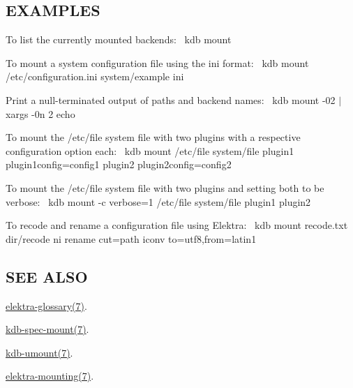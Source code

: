 \subsection*{E\+X\+A\+M\+P\+L\+ES}

To list the currently mounted backends\+:~\newline
 {\ttfamily kdb mount}

To mount a system configuration file using the ini format\+:~\newline
 {\ttfamily kdb mount /etc/configuration.ini system/example ini}

Print a null-\/terminated output of paths and backend names\+:~\newline
 {\ttfamily kdb mount -\/02 $\vert$ xargs -\/0n 2 echo}

To mount the /etc/file system file with two plugins with a respective configuration option each\+:~\newline
 {\ttfamily kdb mount /etc/file system/file plugin1 plugin1config=config1 plugin2 plugin2config=config2}

To mount the /etc/file system file with two plugins and setting both to be verbose\+:~\newline
 {\ttfamily kdb mount -\/c verbose=1 /etc/file system/file plugin1 plugin2}

To recode and rename a configuration file using Elektra\+:~\newline
 {\ttfamily kdb mount recode.\+txt dir/recode ni rename cut=path iconv to=utf8,from=latin1}

\subsection*{S\+EE A\+L\+SO}


\begin{DoxyItemize}
\item \hyperlink{md_doc_help_elektra-glossary_doc_help_elektra-glossary_md}{elektra-\/glossary(7)}.
\item \hyperlink{md_doc_help_kdb-spec-mount_doc_help_kdb-spec-mount_md}{kdb-\/spec-\/mount(7)}.
\item \hyperlink{md_doc_help_kdb-umount_doc_help_kdb-umount_md}{kdb-\/umount(7)}.
\item \hyperlink{md_doc_help_elektra-mounting_doc_help_elektra-mounting_md}{elektra-\/mounting(7)}. 
\end{DoxyItemize}